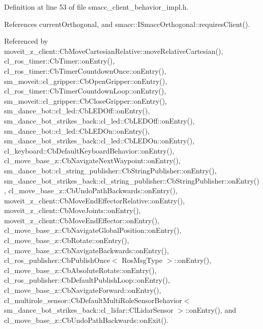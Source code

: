 Definition at line 53 of file smacc\+\_\+client\+\_\+behavior\+\_\+impl.\+h.



References current\+Orthogonal, and smacc\+::\+I\+Smacc\+Orthogonal\+::requires\+Client().



Referenced by moveit\+\_\+z\+\_\+client\+::\+Cb\+Move\+Cartesian\+Relative\+::move\+Relative\+Cartesian(), cl\+\_\+ros\+\_\+timer\+::\+Cb\+Timer\+::on\+Entry(), cl\+\_\+ros\+\_\+timer\+::\+Cb\+Timer\+Countdown\+Once\+::on\+Entry(), sm\+\_\+moveit\+::cl\+\_\+gripper\+::\+Cb\+Open\+Gripper\+::on\+Entry(), cl\+\_\+ros\+\_\+timer\+::\+Cb\+Timer\+Countdown\+Loop\+::on\+Entry(), sm\+\_\+moveit\+::cl\+\_\+gripper\+::\+Cb\+Close\+Gripper\+::on\+Entry(), sm\+\_\+dance\+\_\+bot\+::cl\+\_\+led\+::\+Cb\+L\+E\+D\+Off\+::on\+Entry(), sm\+\_\+dance\+\_\+bot\+\_\+strikes\+\_\+back\+::cl\+\_\+led\+::\+Cb\+L\+E\+D\+Off\+::on\+Entry(), sm\+\_\+dance\+\_\+bot\+::cl\+\_\+led\+::\+Cb\+L\+E\+D\+On\+::on\+Entry(), sm\+\_\+dance\+\_\+bot\+\_\+strikes\+\_\+back\+::cl\+\_\+led\+::\+Cb\+L\+E\+D\+On\+::on\+Entry(), cl\+\_\+keyboard\+::\+Cb\+Default\+Keyboard\+Behavior\+::on\+Entry(), cl\+\_\+move\+\_\+base\+\_\+z\+::\+Cb\+Navigate\+Next\+Waypoint\+::on\+Entry(), sm\+\_\+dance\+\_\+bot\+::cl\+\_\+string\+\_\+publisher\+::\+Cb\+String\+Publisher\+::on\+Entry(), sm\+\_\+dance\+\_\+bot\+\_\+strikes\+\_\+back\+::cl\+\_\+string\+\_\+publisher\+::\+Cb\+String\+Publisher\+::on\+Entry(), cl\+\_\+move\+\_\+base\+\_\+z\+::\+Cb\+Undo\+Path\+Backwards\+::on\+Entry(), moveit\+\_\+z\+\_\+client\+::\+Cb\+Move\+End\+Effector\+Relative\+::on\+Entry(), moveit\+\_\+z\+\_\+client\+::\+Cb\+Move\+Joints\+::on\+Entry(), moveit\+\_\+z\+\_\+client\+::\+Cb\+Move\+End\+Effector\+::on\+Entry(), cl\+\_\+move\+\_\+base\+\_\+z\+::\+Cb\+Navigate\+Global\+Position\+::on\+Entry(), cl\+\_\+move\+\_\+base\+\_\+z\+::\+Cb\+Rotate\+::on\+Entry(), cl\+\_\+move\+\_\+base\+\_\+z\+::\+Cb\+Navigate\+Backwards\+::on\+Entry(), cl\+\_\+ros\+\_\+publisher\+::\+Cb\+Publish\+Once$<$ Ros\+Msg\+Type $>$\+::on\+Entry(), cl\+\_\+move\+\_\+base\+\_\+z\+::\+Cb\+Absolute\+Rotate\+::on\+Entry(), cl\+\_\+ros\+\_\+publisher\+::\+Cb\+Default\+Publish\+Loop\+::on\+Entry(), cl\+\_\+move\+\_\+base\+\_\+z\+::\+Cb\+Navigate\+Forward\+::on\+Entry(), cl\+\_\+multirole\+\_\+sensor\+::\+Cb\+Default\+Multi\+Role\+Sensor\+Behavior$<$ sm\+\_\+dance\+\_\+bot\+\_\+strikes\+\_\+back\+::cl\+\_\+lidar\+::\+Cl\+Lidar\+Sensor $>$\+::on\+Entry(), and cl\+\_\+move\+\_\+base\+\_\+z\+::\+Cb\+Undo\+Path\+Backwards\+::on\+Exit().


